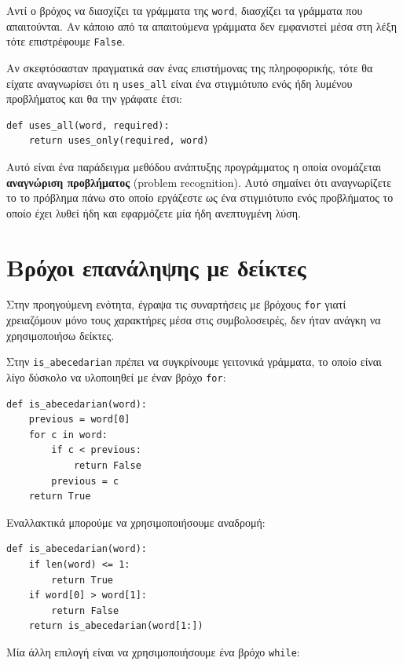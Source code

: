 \documentclass[10pt]{book}
\begin{document}
Αντί ο βρόχος να διασχίζει τα γράμματα της {\tt word}, διασχίζει τα γράμματα που απαιτούνται. Αν κάποιο από τα απαιτούμενα γράμματα δεν εμφανιστεί μέσα στη λέξη τότε επιστρέφουμε {\tt False}.


Αν σκεφτόσασταν πραγματικά σαν ένας επιστήμονας της πληροφορικής, τότε θα είχατε αναγνωρίσει ότι η \verb"uses_all" είναι ένα στιγμιότυπο ενός ήδη λυμένου προβλήματος και θα την γράφατε έτσι:

\begin{verbatim}
def uses_all(word, required):
    return uses_only(required, word)
\end{verbatim}
%

Αυτό είναι ένα παράδειγμα μεθόδου ανάπτυξης προγράμματος η οποία ονομάζεται {\bf αναγνώριση προβλήματος} (problem recognition). Αυτό σημαίνει ότι αναγνωρίζετε το το πρόβλημα πάνω στο οποίο εργάζεστε ως ένα στιγμιότυπο ενός προβλήματος το οποίο έχει λυθεί ήδη και εφαρμόζετε μία ήδη ανεπτυγμένη λύση.


\section{Βρόχοι επανάληψης με δείκτες}

Στην προηγούμενη ενότητα, έγραψα τις συναρτήσεις με βρόχους {\tt for} γιατί
χρειαζόμουν μόνο τους χαρακτήρες μέσα στις συμβολοσειρές, δεν ήταν ανάγκη να χρησιμοποιήσω δείκτες.

Στην \verb"is_abecedarian" πρέπει να συγκρίνουμε γειτονικά γράμματα, το οποίο είναι λίγο δύσκολο να υλοποιηθεί με έναν βρόχο {\tt for}:

\begin{verbatim}
def is_abecedarian(word):
    previous = word[0]
    for c in word:
        if c < previous:
            return False
        previous = c
    return True
\end{verbatim}


Εναλλακτικά μπορούμε να χρησιμοποιήσουμε αναδρομή:

\begin{verbatim}
def is_abecedarian(word):
    if len(word) <= 1:
        return True
    if word[0] > word[1]:
        return False
    return is_abecedarian(word[1:])
\end{verbatim}


Μία άλλη επιλογή είναι να χρησιμοποιήσουμε ένα βρόχο {\tt while}:
\end{document}
